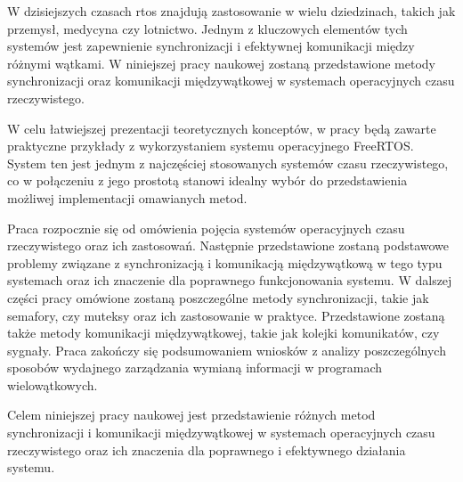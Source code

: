 W dzisiejszych czasach \gls{rtos} znajdują zastosowanie w wielu dziedzinach,
takich jak przemysł, medycyna czy lotnictwo. Jednym z kluczowych elementów tych systemów jest zapewnienie synchronizacji
i efektywnej komunikacji między różnymi wątkami. W niniejszej pracy naukowej zostaną przedstawione
metody synchronizacji oraz komunikacji międzywątkowej w systemach operacyjnych czasu rzeczywistego.

W celu łatwiejszej prezentacji teoretycznych konceptów, w pracy będą zawarte praktyczne przykłady
z wykorzystaniem systemu operacyjnego FreeRTOS. System ten jest jednym z najczęściej stosowanych systemów
czasu rzeczywistego, co w połączeniu z jego prostotą stanowi idealny wybór do przedstawienia
możliwej implementacji omawianych metod.

Praca rozpocznie się od omówienia pojęcia systemów operacyjnych czasu rzeczywistego oraz ich zastosowań.
Następnie przedstawione zostaną podstawowe problemy związane z synchronizacją i komunikacją międzywątkową
w tego typu systemach oraz ich znaczenie dla poprawnego funkcjonowania systemu.
W dalszej części pracy omówione zostaną poszczególne metody synchronizacji, takie jak semafory, czy muteksy
oraz ich zastosowanie w praktyce. Przedstawione zostaną także metody komunikacji
międzywątkowej, takie jak kolejki komunikatów, czy sygnały.
Praca zakończy się podsumowaniem wniosków z analizy poszczególnych sposobów wydajnego zarządzania
wymianą informacji w programach wielowątkowych.

Celem niniejszej pracy naukowej jest przedstawienie różnych metod
synchronizacji i komunikacji międzywątkowej w systemach operacyjnych czasu rzeczywistego oraz ich
znaczenia dla poprawnego i efektywnego działania systemu.
